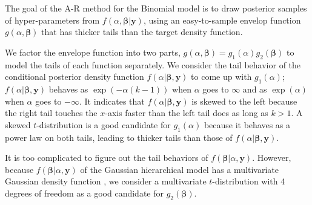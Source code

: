\documentclass[article]{jss}
\begin{document}
The goal of the A-R method  for the  Binomial model is to  draw  posterior samples of hyper-parameters from $f(\alpha, \boldsymbol{\beta}\vert \boldsymbol{y})$, using an easy-to-sample envelop function $g(\alpha, \boldsymbol{\beta})$ that has thicker tails than the target density function. 

We factor the envelope function into two parts, $g(\alpha, \boldsymbol{\beta})=g_1(\alpha)g_2(\boldsymbol{\beta})$ to model the tails of each function separately. We consider the tail behavior of the conditional posterior density function $f(\alpha \vert \boldsymbol{\beta},  \boldsymbol{y})$ to come up with $g_1(\alpha)$; $f(\alpha \vert \boldsymbol{\beta},  \boldsymbol{y})$ behaves as $\exp(-\alpha(k-1))$ when $\alpha$ goes to $\infty$ and as $\exp(\alpha)$ when $\alpha$ goes to $-\infty$. It indicates that $f(\alpha \vert \boldsymbol{\beta},  \boldsymbol{y})$ is skewed to the left because the right tail touches the $x$-axis faster than the left tail does as long as $k>1$.  A skewed $t$-distribution  is a good candidate for $g_1(\alpha)$ because it behaves as a power law on both tails, leading to thicker tails than those of $f(\alpha \vert \boldsymbol{\beta},  \boldsymbol{y})$. 

It is too complicated to figure out the tail behaviors of $f(\boldsymbol{\beta} \vert \alpha,  \boldsymbol{y})$. However, because $f(\boldsymbol{\beta} \vert \alpha,  \boldsymbol{y})$ of the Gaussian hierarchical model has a multivariate Gaussian density function \citep{tang2011, kelly2014advances}, we consider a multivariate $t$-distribution with 4  degrees of freedom as a good candidate for $g_2(\boldsymbol{\beta})$.
\end{document}
